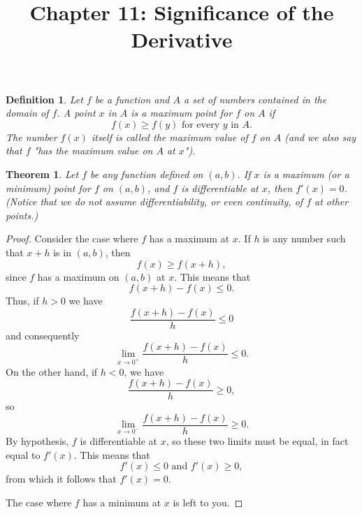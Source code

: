 \documentclass{article}
\newtheorem{definition}{Definition}
\newtheorem{theorem}{Theorem}
\begin{document}
\title{Chapter 11: Significance of the Derivative}
\maketitle

\begin{definition}
  Let $f$ be a function and $A$ a set of numbers contained in the domain of
  $f$. A point $x$ in $A$ is a \emph{maximum point} for $f$ on $A$ if
  \begin{equation*}
    f(x) \geq f(y) \text{ for every } y \text{ in } A.
  \end{equation*}
  The number $f(x)$ itself is called the \emph{maximum value} of $f$ on $A$
  (and we also say that $f$ "has the maximum value on $A$ at $x$").
\end{definition}

\begin{theorem}
  Let $f$ be any function defined on $(a, b)$. If $x$ is a maximum (or a
  minimum) point for $f$ on $(a, b)$, and $f$ is differentiable at $x$, then
  $f'(x) = 0$.
  (Notice that we do not assume differentiability, or even continuity, of $f$
  at other points.)
\end{theorem}

\begin{proof}
  Consider the case where $f$ has a maximum at $x$. If $h$ is any number such
  that $x + h$ is in $(a, b)$, then \begin{equation*}
    f(x) \geq f(x + h),
  \end{equation*} since $f$ has a maximum on $(a, b)$ at $x$. This means that
  \begin{equation*}
    f(x + h) - f(x) \leq 0.
  \end{equation*} Thus, if $h > 0$ we have \begin{equation*}
    \frac{f(x + h) - f(x)}{h} \leq 0
  \end{equation*} and consequently \begin{equation*}
    \lim_{x \rightarrow 0^+} \frac{f(x + h) - f(x)}{h} \leq 0.
  \end{equation*} On the other hand, if $h < 0$, we have \begin{equation*}
    \frac{f(x + h) - f(x)}{h} \geq 0,
  \end{equation*} so \begin{equation*}
    \lim_{x \rightarrow 0^-} \frac{f(x + h) - f(x)}{h} \geq 0.
  \end{equation*} By hypothesis, $f$ is differentiable at $x$, so these two
  limits must be equal, in fact equal to $f'(x)$. This means that
  \begin{equation*}
    f'(x) \leq 0 \text{ and } f'(x) \geq 0,
  \end{equation*} from which it follows that $f'(x) = 0$.

  The case where $f$ has a minimum at $x$ is left to you.
\end{proof}
\end{document}
